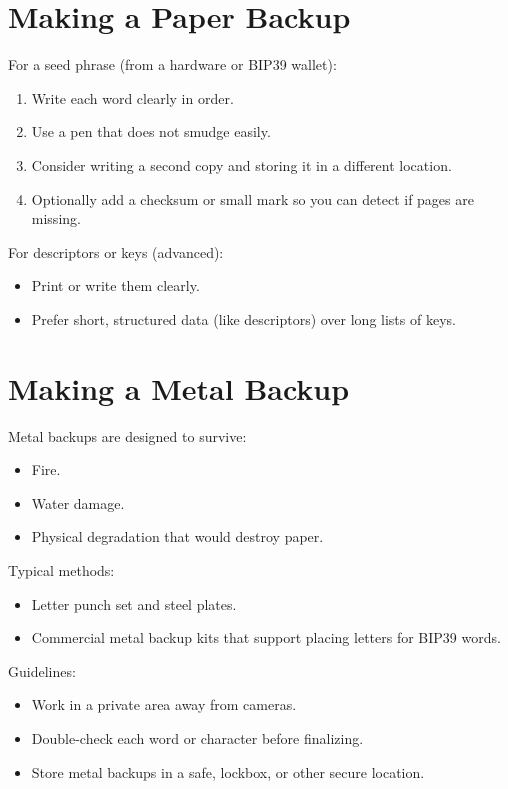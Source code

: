 \documentclass[12pt,a4paper]{book}
\begin{document}
\section{Making a Paper Backup}

For a seed phrase (from a hardware or BIP39 wallet):

\begin{enumerate}
  \item Write each word clearly in order.
  \item Use a pen that does not smudge easily.
  \item Consider writing a second copy and storing it in a different location.
  \item Optionally add a checksum or small mark so you can detect if pages are missing.
\end{enumerate}

For descriptors or keys (advanced):

\begin{itemize}
  \item Print or write them clearly.
  \item Prefer short, structured data (like descriptors) over long lists of keys.
\end{itemize}

\section{Making a Metal Backup}

Metal backups are designed to survive:

\begin{itemize}
  \item Fire.
  \item Water damage.
  \item Physical degradation that would destroy paper.
\end{itemize}

Typical methods:

\begin{itemize}
  \item Letter punch set and steel plates.
  \item Commercial metal backup kits that support placing letters for BIP39 words.
\end{itemize}

Guidelines:

\begin{itemize}
  \item Work in a private area away from cameras.
  \item Double-check each word or character before finalizing.
  \item Store metal backups in a safe, lockbox, or other secure location.
\end{itemize}
\end{document}
